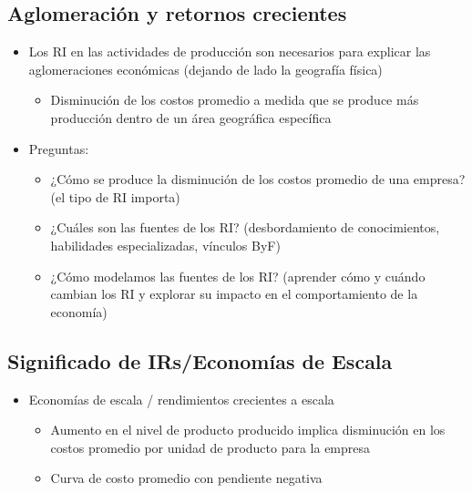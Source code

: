 \subsection{Aglomeración y retornos crecientes}
\begin{itemize}
    \item Los RI en las actividades de producción son necesarios para explicar las aglomeraciones económicas (dejando de lado la geografía física) 
	\begin{itemize}
	    \item Disminución de los costos promedio a medida que se produce más producción dentro de un área geográfica específica 
	\end{itemize}
    \item Preguntas: 
	\begin{itemize}
	    \item ¿Cómo se produce la disminución de los costos promedio de una empresa? (el tipo de RI importa) 
	    \item ¿Cuáles son las fuentes de los RI? (desbordamiento de conocimientos, habilidades especializadas, vínculos ByF) 
	    \item ¿Cómo modelamos las fuentes de los RI? (aprender cómo y cuándo cambian los RI y explorar su impacto en el comportamiento de la economía)
\end{itemize}
\end{itemize}

\subsection{Significado de IRs/Economías de Escala}
\begin{itemize}
    \item Economías de escala / rendimientos crecientes a escala
	\begin{itemize}
	    \item Aumento en el nivel de producto producido implica disminución en los costos promedio por unidad de producto para la empresa 
	    \item Curva de costo promedio con pendiente negativa
	\end{itemize}
\end{itemize}

